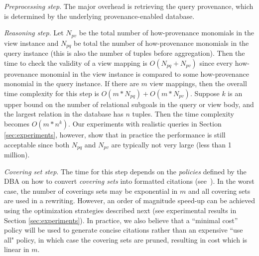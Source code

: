 {\em Preprocessing step}.  The major overhead is retrieving the query provenance, which is determined by the underlying provenance-enabled database. 

{\em Reasoning step}. 
Let $N_{pv}$ be the total number of how-provenance monomials in the view instance and $N_{pq}$ be total the number of how-provenance monomials in the query instance (this is also the number of tuples before aggregation).  Then the time to check the validity of a view mapping is $O(N_{pq} + N_{pv})$ since every how-provenance monomial in the view instance is compared to some how-provenance monomial in the query instance. 
If there are $m$ view mappings, then the overall time complexity for this step is $O(m*N_{pq}) + O(m*N_{pv})$.
Suppose $k$ is an upper bound on the number of relational subgoals in the query or view body, and the largest relation in the database has $n$ tuples.
Then the time complexity becomes $O(m*n^k)$.  Our experiments with realistic queries in Section \ref{sec:experiments}\eat{~\ref{ssec: realistic}}, however, show that in practice the performance is still acceptable since both $N_{pq}$ and $N_{pv}$ are typically not very large (less than 1 million).


{\em Covering set step}.  The time for this step depends on the {\em policies} defined by the DBA on how to convert {\em covering sets} into formatted citations
(see~\cite{wu2018data}).  
In the worst case, the number of coverings sets may be exponential in $m$ and all covering sets are used in a rewriting. However, an order of magnitude speed-up can be achieved using the optimization strategies described  next (see experimental results in Section \ref{sec:experiments}).
In practice, we also believe that a ``minimal cost'' policy will be used to generate concise citations rather than an expensive ``use all" policy, in which case the covering sets are pruned, resulting in cost which is linear in $m$.



